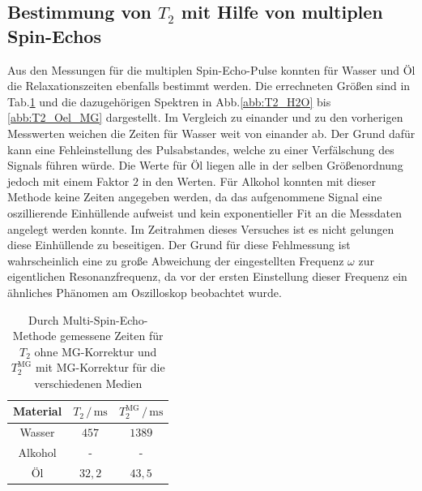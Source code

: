 \documentclass[numbers=noenddot,a4paper,notitlepage,twoside,BCOR15mm]{scrartcl}
\begin{document}
	\subsection{Bestimmung von $T_2$ mit Hilfe von multiplen Spin-Echos}
	
	Aus den Messungen für die multiplen Spin-Echo-Pulse konnten für Wasser und Öl die Relaxationszeiten ebenfalls bestimmt werden. Die errechneten Größen sind in Tab.\ref{tab:multiT2} und die dazugehörigen Spektren in Abb.\ref{abb:T2_H2O} bis \ref{abb:T2_Oel_MG} dargestellt. Im Vergleich zu einander und zu den vorherigen Messwerten weichen die Zeiten für Wasser weit von einander ab. Der Grund dafür kann eine Fehleinstellung des Pulsabstandes, welche zu einer Verfälschung des Signals führen würde. Die Werte für Öl liegen alle in der selben Größenordnung jedoch mit einem Faktor $2$ in den Werten. Für Alkohol konnten mit dieser Methode keine Zeiten angegeben werden, da das aufgenommene Signal eine oszillierende Einhüllende aufweist und kein exponentieller Fit an die Messdaten angelegt werden konnte. Im Zeitrahmen dieses Versuches ist es nicht gelungen diese Einhüllende zu beseitigen. Der Grund für diese Fehlmessung ist wahrscheinlich eine zu große Abweichung der eingestellten Frequenz $\omega$ zur eigentlichen Resonanzfrequenz, da vor der ersten Einstellung dieser Frequenz ein ähnliches Phänomen am Oszilloskop beobachtet wurde.
	
	\begin{table}[h]
		\centering
		\caption{Durch Multi-Spin-Echo-Methode gemessene Zeiten für $T_2$ ohne MG-Korrektur und  $T_{2}^\mathrm{MG}$ mit MG-Korrektur für die verschiedenen Medien}
		\begin{tabular}{c c c}
			Material & $T_2\,/\,\mathrm{ms}$ & $T_{2}^\mathrm{MG}\,/\,\mathrm{ms}$ \\ \hline
			Wasser 	& $457$ & $1389$ \\
			Alkohol & - & -  \\
			Öl 		& $32,2$ & $43,5$ 
		\end{tabular}
		\label{tab:multiT2}
	\end{table}
	
\end{document}
